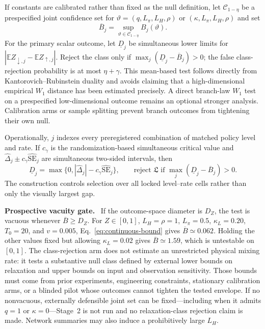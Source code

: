 \documentclass[pdflatex,sn-mathphys-num]{sn-jnl}
\newcommand{\E}{\mathbb{E}}
\newcommand{\inlinehead}[1]{\par\smallskip\noindent\textbf{#1}\ }
\begin{document}
If constants are calibrated rather than fixed as the null definition, let $\mathcal C_{1-\eta}$ be a prespecified joint confidence set for $\vartheta=(q,L_\pi,L_H,\rho)$ or $(\kappa,L_\pi,L_H,\rho)$ and set
\begin{equation}
\overline B_j=\sup_{\vartheta\in\mathcal C_{1-\eta}}B_j(\vartheta).
\label{eq:lag-envelope}
\end{equation}
For the primary scalar outcome, let $\underline D_j$ be simultaneous lower limits for $|\E Z_{\downarrow,j}-\E Z_{\uparrow,j}|$. Reject the class only if $\max_j(\underline D_j-\overline B_j)>0$; the false class-rejection probability is at most $\eta+\gamma$. This mean-based test follows directly from Kantorovich--Rubinstein duality and avoids claiming that a high-dimensional empirical $W_1$ distance has been estimated precisely. A direct branch-law $W_1$ test on a prespecified low-dimensional outcome remains an optional stronger analysis. Calibration arms or sample splitting prevent branch outcomes from tightening their own null.

Operationally, $j$ indexes every preregistered combination of matched policy level and rate. If $c_\gamma$ is the randomization-based simultaneous critical value and $\widehat\Delta_j\pm c_\gamma\widehat{\mathrm{SE}}_j$ are simultaneous two-sided intervals, then
\begin{equation}
\underline D_j=\max\{0,|\widehat\Delta_j|-c_\gamma\widehat{\mathrm{SE}}_j\},
\qquad
\text{reject }\mathfrak L\text{ if }\max_j(\underline D_j-\overline B_j)>0.
\label{eq:simultaneous-lower-bound}
\end{equation}
The construction controls selection over all locked level--rate cells rather than only the visually largest gap.

\inlinehead{Prospective vacuity gate.} If the outcome-space diameter is $D_Z$, the test is vacuous whenever $\overline B\geq D_Z$. For $Z\in[0,1]$, $L_H=\rho=1$, $L_\pi=0.5$, $\kappa_L=0.20$, $T_0=20$, and $v=0.005$, Eq.~\eqref{eq:continuous-bound} gives $\overline B\simeq0.062$. Holding the other values fixed but allowing $\kappa_L=0.02$ gives $\overline B\simeq1.59$, which is untestable on $[0,1]$. The class-rejection arm does not estimate an unrestricted physical mixing rate: it tests a substantive null class defined by external lower bounds on relaxation and upper bounds on input and observation sensitivity. Those bounds must come from prior experiments, engineering constraints, stationary calibration arms, or a blinded pilot whose outcomes cannot tighten the tested envelope. If no nonvacuous, externally defensible joint set can be fixed---including when it admits $q=1$ or $\kappa=0$---Stage~2 is not run and no relaxation-class rejection claim is made. Network summaries may also induce a prohibitively large $L_H$.
\end{document}
